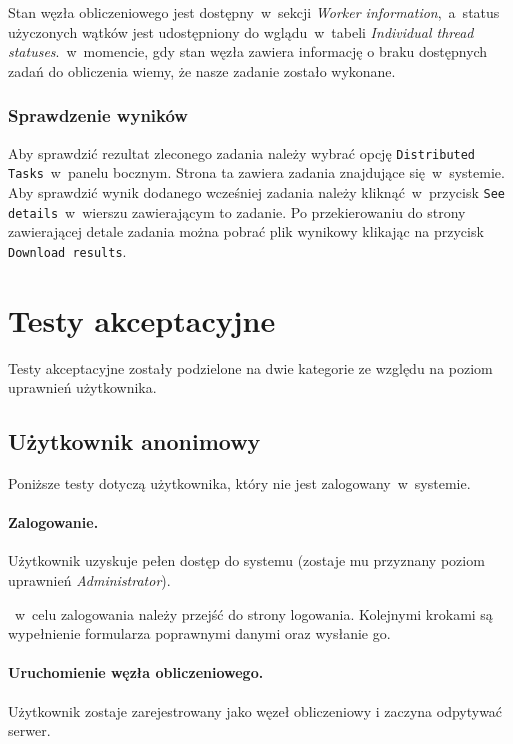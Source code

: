 \documentclass[a4paper,11pt,twoside]{report}
\theoremstyle{definition}
\begin{document}
        
        Stan węzła obliczeniowego jest dostępny~w~sekcji \textit{Worker information},~a~status użyczonych wątków jest udostępniony do wglądu~w~tabeli \textit{Individual thread statuses}.~w~momencie, gdy stan węzła zawiera informację o braku dostępnych zadań do obliczenia wiemy, że nasze zadanie zostało wykonane.
        
        
        \subsubsection{Sprawdzenie wyników}
        
        Aby sprawdzić rezultat zleconego zadania należy wybrać opcję \texttt{Distributed Tasks}~w~panelu bocznym.
        Strona ta zawiera zadania znajdujące się~w~systemie.
        Aby sprawdzić wynik dodanego wcześniej zadania należy kliknąć~w~przycisk \texttt{See details}~w~wierszu zawierającym to zadanie.
        Po przekierowaniu do strony zawierającej detale zadania można pobrać plik wynikowy klikając na przycisk \texttt{Download results}.

    
    \section{Testy akceptacyjne}
        
        Testy akceptacyjne zostały podzielone na dwie kategorie ze względu na poziom uprawnień użytkownika.
        
        \subsection{Użytkownik anonimowy}
            Poniższe testy dotyczą użytkownika, który nie jest zalogowany~w~systemie.
        
        
            \paragraph{Zalogowanie.} 
                \noindent Użytkownik uzyskuje pełen dostęp do systemu (zostaje mu przyznany poziom uprawnień \textit{Administrator}). 
            
               ~w~celu zalogowania należy przejść do strony logowania. Kolejnymi krokami są wypełnienie formularza poprawnymi danymi oraz wysłanie go.
                
            \paragraph{Uruchomienie węzła obliczeniowego.} 
                \noindent Użytkownik zostaje zarejestrowany jako węzeł obliczeniowy i zaczyna odpytywać serwer.
                
\end{document}
